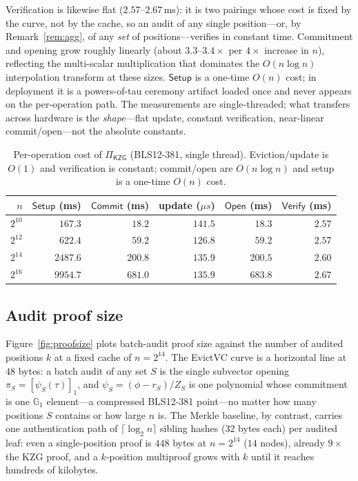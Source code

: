 \documentclass[version=preprint]{iacrcc}
\theoremstyle{definition}
\newcommand{\Setup}{\mathsf{Setup}}
\newcommand{\Commit}{\mathsf{Commit}}
\newcommand{\Open}{\mathsf{Open}}
\newcommand{\Vfy}{\mathsf{Verify}}
\newcommand{\GG}{\mathbb{G}}
\newcommand{\gone}[1]{\left[#1\right]_{1}}
\newcommand{\Zpol}{Z}
\newcommand{\rpol}{r}
\begin{document}
Verification is likewise flat ($2.57$--$2.67\,$ms): it is two pairings whose cost
is fixed by the curve, not by the cache, so an audit of any single position---or,
by Remark~\ref{rem:agg}, of any \emph{set} of positions---verifies in constant
time. Commitment and opening grow roughly linearly (about $3.3$--$3.4\times$ per
$4\times$ increase in $n$), reflecting the multi-scalar multiplication that
dominates the $O(n\log n)$ interpolation transform at these sizes. $\Setup$ is a
one-time $O(n)$ cost; in deployment it is a powers-of-tau ceremony artifact loaded
once and never appears on the per-operation path. The measurements are
single-threaded; what transfers across hardware is the \emph{shape}---flat
update, constant verification, near-linear commit/open---not the absolute
constants.

\begin{table}[t]\centering
\renewcommand{\arraystretch}{1.1}
\begin{tabular}{@{}rrrrrr@{}}
\toprule
$n$ & $\Setup$ (ms) & $\Commit$ (ms) & update ($\mu s$) & $\Open$ (ms) & $\Vfy$ (ms)\\
\midrule
$2^{10}$ & $167.3$  & $18.2$  & $141.5$ & $18.3$  & $2.57$\\
$2^{12}$ & $622.4$  & $59.2$  & $126.8$ & $59.2$  & $2.57$\\
$2^{14}$ & $2487.6$ & $200.8$ & $135.9$ & $200.5$ & $2.60$\\
$2^{16}$ & $9954.7$ & $681.0$ & $135.9$ & $683.8$ & $2.67$\\
\bottomrule
\end{tabular}
\caption{Per-operation cost of $\Pi_{\mathsf{KZG}}$ (BLS12-381, single thread).
Eviction/update is $O(1)$ and verification is constant; commit/open are
$O(n\log n)$ and setup is a one-time $O(n)$ cost.}
\label{tab:maint}
\end{table}

\subsection{Audit proof size}
Figure~\ref{fig:proofsize} plots batch-audit proof size against the number of
audited positions $k$ at a fixed cache of $n=2^{14}$. The EvictVC curve is a
horizontal line at $48$ bytes: a batch audit of any set $S$ is the single
subvector opening $\pi_S=\gone{\psi_S(\tau)}$, and
$\psi_S=(\phi-\rpol_S)/\Zpol_S$ is one polynomial whose commitment is one $\GG_1$
element---a compressed BLS12-381 point---no matter how many positions $S$
contains or how large $n$ is. The Merkle baseline, by contrast, carries one
authentication path of $\lceil\log_2 n\rceil$ sibling hashes ($32$ bytes each)
per audited leaf: even a single-position proof is $448$ bytes at $n=2^{14}$
($14$ nodes), already $9\times$ the KZG proof, and a $k$-position multiproof grows
with $k$ until it reaches hundreds of kilobytes.
\end{document}

